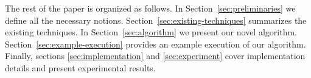 The rest of the paper is organized as follows. In Section~\ref{sec:preliminaries} we define all the necessary notions. Section~\ref{sec:existing-techniques} summarizes the existing techniques. In Section~\ref{sec:algorithm} we present our novel algorithm. Section~\ref{sec:example-execution} provides an example execution of our algorithm. Finally, sections \ref{sec:implementation} and \ref{sec:experiment} cover implementation details and present experimental results. 	


